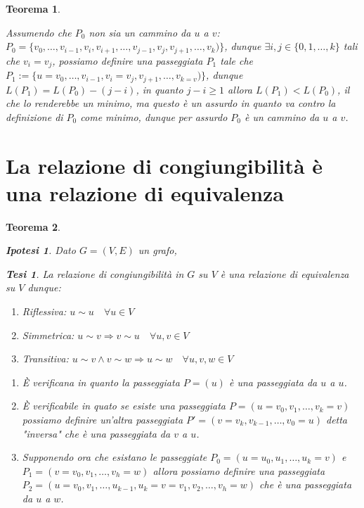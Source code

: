 \documentclass{article}
\makeatletter
\renewenvironment{proof}[1][\proofname]{\par
    \pushQED{\qed}%
    \normalfont \topsep6\p@\@plus6\p@\relax
    \trivlist
    \item\relax
    {\itshape
    #1\@addpunct{.}}\hspace\labelsep\ignorespaces
    }{%
    \popQED\endtrivlist\@endpefalse
}
\newtheorem{theorem}{Teorema}[part]
\newtheorem{ipothesis}[lemma]{Ipotesi}
\newtheorem{thesis}[lemma]{Tesi}
\makeatother
\begin{document}
\begin{theorem}
\begin{proof}
\begin{enumerate}
                        Assumendo che \(P_0\) non sia un cammino da \(u\) a \(v\): \(P_0=\{v_0,\ldots,v_{i-1},v_i,v_{i+1},\ldots,v_{j-1},v_{j},v_{j+1},\ldots,v_{k})\}\), dunque \(\exists i,j\in\{0,1,\ldots,k\}\) tali che \(v_i=v_j\),
                        possiamo definire una passeggiata \(P_1\) tale che \(P_1:=\{u=v_0,\ldots,v_{i-1},v_i=v_j,v_{j+1},\ldots,v_{k=v})\}\), dunque \(L(P_1)=L(P_0)-(j-i)\), in quanto \(j-i\geq 1\) allora \(L(P_1)<L(P_0)\), il che lo renderebbe un minimo, ma questo è un assurdo in quanto va contro la definizione di \(P_0\) come minimo, dunque per assurdo \(P_0\) è un cammino da \(u\) a \(v\).
                    \end{enumerate}
                    \pushQED{}
            \end{proof}
            \raggedleft{{\ensuremath{\blacksquare}}}
        \end{theorem}
    \section{La relazione di congiungibilità è una relazione di equivalenza}
        \begin{theorem}
            \begin{ipothesis}
                Dato \(G=(V,E)\) un grafo,
            \end{ipothesis}
            \begin{thesis}
                La relazione di congiungibilità in \(G\) su \(V\) è una relazione di equivalenza su \(V\) dunque:
                \begin{enumerate}
                    \item Riflessiva: \(u\sim u\quad \forall u\in V\)
                    \item Simmetrica: \(u\sim v\Rightarrow v\sim u\quad \forall u,v\in V\)
                    \item Transitiva: \(u\sim v\land v\sim w\Rightarrow u\sim w\quad \forall u,v,w\in V\)
                \end{enumerate}
            \end{thesis}
            \begin{proof}
                \begin{enumerate}
                    \item È verificana in quanto la passeggiata \(P=(u)\) è una passeggiata da \(u\) a \(u\).
                    \item È verificabile in quato se esiste una passeggiata \(P=(u=v_0,v_1,\ldots,v_k=v)\) possiamo definire un'altra passeggiata \(P'=(v=v_k,v_{k-1},\ldots,v_0=u)\) detta "inversa" che è una passeggiata da \(v\) a \(u\).
                    \item Supponendo ora che esistano le passeggiate \(P_0=(u=u_0,u_1,\ldots,u_k=v)\) e \(P_1=(v=v_0,v_1,\ldots,v_h=w)\) allora possiamo definire una passeggiata \(P_2=(u=v_0,v_1,\ldots,u_{k-1},u_{k}=v=v_{1},v_{2},\ldots,v_h=w)\) che è una passeggiata da \(u\) a \(w\).
                \end{enumerate}
                \pushQED{}
            \end{proof}
            \raggedleft{{\ensuremath{\blacksquare}}}
        \end{theorem}
\end{document}
